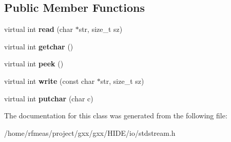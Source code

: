 \subsection*{Public Member Functions}
\begin{DoxyCompactItemize}
\item 
virtual int {\bfseries read} (char $\ast$str, size\+\_\+t sz)\hypertarget{classgxx_1_1std__stream_a8a0e8f482a9701d2718b830809a35fc5}{}\label{classgxx_1_1std__stream_a8a0e8f482a9701d2718b830809a35fc5}

\item 
virtual int {\bfseries getchar} ()\hypertarget{classgxx_1_1std__stream_ab267966d1545b1bc70f1ea80d3f5e857}{}\label{classgxx_1_1std__stream_ab267966d1545b1bc70f1ea80d3f5e857}

\item 
virtual int {\bfseries peek} ()\hypertarget{classgxx_1_1std__stream_aef5c2245c4d1cbd593d16037102888ea}{}\label{classgxx_1_1std__stream_aef5c2245c4d1cbd593d16037102888ea}

\item 
virtual int {\bfseries write} (const char $\ast$str, size\+\_\+t sz)\hypertarget{classgxx_1_1std__stream_a52292fabcf42ddec09a81db53f866f6b}{}\label{classgxx_1_1std__stream_a52292fabcf42ddec09a81db53f866f6b}

\item 
virtual int {\bfseries putchar} (char c)\hypertarget{classgxx_1_1std__stream_ac2bf5bfbb43828258fc1bc3ef1676720}{}\label{classgxx_1_1std__stream_ac2bf5bfbb43828258fc1bc3ef1676720}

\end{DoxyCompactItemize}


The documentation for this class was generated from the following file\+:\begin{DoxyCompactItemize}
\item 
/home/rfmeas/project/gxx/gxx/\+H\+I\+D\+E/io/stdstream.\+h\end{DoxyCompactItemize}
